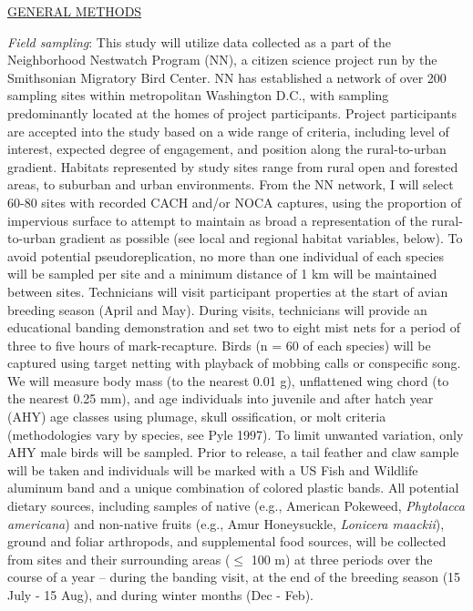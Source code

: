 \documentclass[12pt]{article}
\begin{document}

\noindent \underline{GENERAL METHODS}\par

\noindent \textit {Field sampling}: This study will utilize data collected as a part of the Neighborhood Nestwatch Program (NN), a citizen science project run by the Smithsonian Migratory Bird Center. NN has established a network of over 200 sampling sites within metropolitan Washington D.C., with sampling predominantly located at the homes of project participants. Project participants are accepted into the study based on a wide range of criteria, including level of interest, expected degree of engagement, and position along the rural-to-urban gradient. Habitats represented by study sites range from rural open and forested areas, to suburban and urban environments. From the NN network, I will select 60-80 sites with recorded CACH and/or NOCA captures, using the proportion of impervious surface to attempt to maintain as broad a representation of the rural-to-urban gradient as possible (see local and regional habitat variables, below). To avoid potential pseudoreplication, no more than one individual of each species will be sampled per site and a minimum distance of 1 km will be maintained between sites. Technicians will visit participant properties at the start of avian breeding season (April and May). During visits, technicians will provide an educational banding demonstration and set two to eight mist nets for a period of three to five hours of mark-recapture. Birds (n = 60 of each species) will be captured using target netting with playback of mobbing calls or conspecific song. We will measure body mass (to the nearest 0.01 g), unflattened wing chord (to the nearest 0.25 mm), and age individuals into juvenile and after hatch year (AHY) age classes using plumage, skull ossification, or molt criteria (methodologies vary by species, see Pyle 1997). To limit unwanted variation, only AHY male birds will be sampled. Prior to release, a  tail feather and claw sample will be taken and individuals will be marked with a US Fish and Wildlife aluminum band and a unique combination of colored plastic bands. All potential dietary sources, including samples of native  (e.g., American  Pokeweed, \textit {Phytolacca americana}) and non-native fruits (e.g., Amur Honeysuckle, \textit {Lonicera maackii}), ground and foliar arthropods, and supplemental food sources, will be collected from sites and their surrounding areas ($\leq$ 100 m) at three periods over the course of a year -- during the banding visit, at the end of the breeding season (15 July - 15 Aug), and during winter months (Dec - Feb).\par
\end{document}
